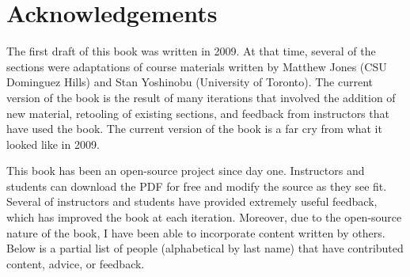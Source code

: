 \chapter*{Acknowledgements}

The first draft of this book was written in 2009. At that time, several of the sections were adaptations of course materials written by Matthew Jones (CSU Dominguez Hills) and Stan Yoshinobu (University of Toronto). The current version of the book is the result of many iterations that involved the addition of new material, retooling of existing sections, and feedback from instructors that have used the book. The current version of the book is a far cry from what it looked like in 2009.

This book has been an open-source project since day one. Instructors and students can download the PDF for free and modify the source as they see fit. Several of instructors and students have provided extremely useful feedback, which has improved the book at each iteration. Moreover, due to the open-source nature of the book, I have been able to incorporate content written by others. Below is a partial list of people (alphabetical by last name) that have contributed content, advice, or feedback.

